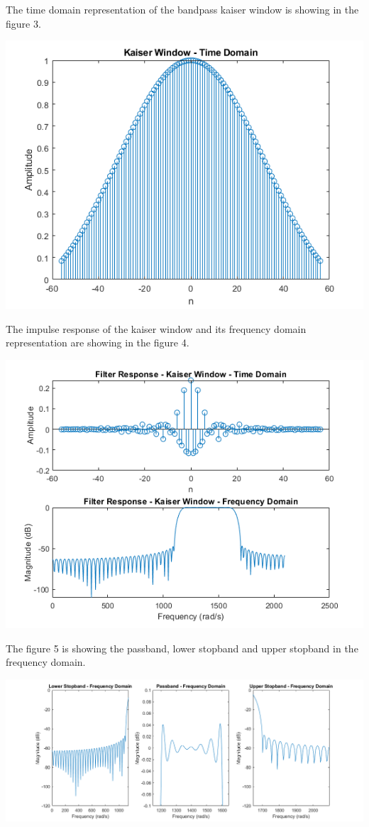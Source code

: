 \documentclass[oneside,11pt,onecolumn,a4paper]{report}
\begin{document}
The time domain representation of the bandpass kaiser window is showing in the figure 3.

\includegraphics[scale=0.9]{window}

The impulse response of the  kaiser window and its frequency domain representation are showing in the figure 4.

\includegraphics[scale=0.8]{kaiser}


The figure 5 is showing the passband, lower stopband and upper stopband in the frequency domain.

\includegraphics[scale=0.5]{bands}
\end{document}
